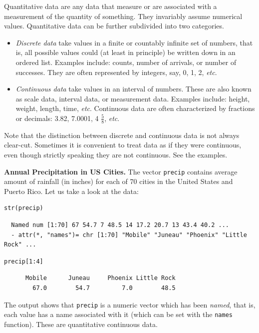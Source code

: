 \documentclass[captions=tableheading]{scrbook}
\begin{document}
Quantitative data are any data that measure or are associated with a measurement of the quantity of something. They invariably assume numerical values. Quantitative data can be further subdivided into two categories. 

\begin{itemize}
\item \emph{Discrete data} take values in a finite or countably infinite set of numbers, that is, all possible values could (at least in principle) be written down in an ordered list. Examples include: counts, number of arrivals, or number of successes. They are often represented by integers, say, 0, 1, 2, \emph{etc}.
\item \emph{Continuous data} take values in an interval of numbers. These are also known as scale data, interval data, or measurement data. Examples include: height, weight, length, time, \emph{etc}. Continuous data are often characterized by fractions or decimals: 3.82, 7.0001, 4 \(\frac{5}{8}\), \emph{etc}.
\end{itemize}

Note that the distinction between discrete and continuous data is not always clear-cut. Sometimes it is convenient to treat data as if they were continuous, even though strictly speaking they are not continuous. See the examples.

\begin{example}
\textbf{Annual Precipitation in US Cities.} The vector \texttt{precip} contains average amount of rainfall (in inches) for each of 70 cities in the United States and Puerto Rico. Let us take a look at the data:


\begin{verbatim}
str(precip)
\end{verbatim}

\begin{verbatim}
  Named num [1:70] 67 54.7 7 48.5 14 17.2 20.7 13 43.4 40.2 ...
  - attr(*, "names")= chr [1:70] "Mobile" "Juneau" "Phoenix" "Little Rock" ...
\end{verbatim}


\begin{verbatim}
precip[1:4]
\end{verbatim}

\begin{verbatim}
      Mobile      Juneau     Phoenix Little Rock 
        67.0        54.7         7.0        48.5
\end{verbatim}

The output shows that \texttt{precip} is a numeric vector which has been \emph{named}, that is, each value has a name associated with it (which can be set with the \texttt{names} function). These are quantitative continuous data.

\end{example}
\end{document}
